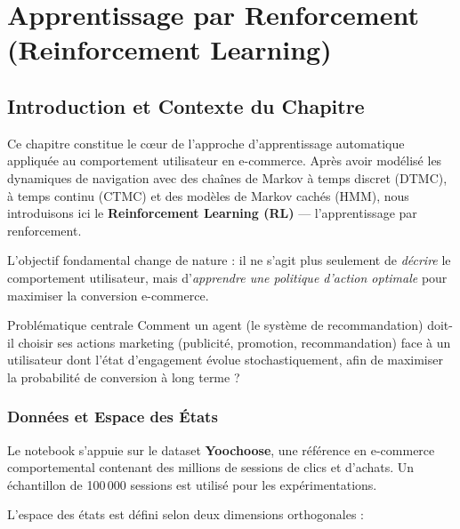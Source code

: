 \documentclass[11pt,a4paper]{article}
\begin{document}
\section{Apprentissage par Renforcement (Reinforcement Learning)}




\subsection{Introduction et Contexte du Chapitre}

Ce chapitre constitue le cœur de l'approche d'apprentissage automatique appliquée au comportement utilisateur en e-commerce. Après avoir modélisé les dynamiques de navigation avec des chaînes de Markov à temps discret (DTMC), à temps continu (CTMC) et des modèles de Markov cachés (HMM), nous introduisons ici le \textbf{Reinforcement Learning (RL)} — l'apprentissage par renforcement.

L'objectif fondamental change de nature : il ne s'agit plus seulement de \emph{décrire} le comportement utilisateur, mais d'\emph{apprendre une politique d'action optimale} pour maximiser la conversion e-commerce.

\begin{exbox}{Problématique centrale}
Comment un agent (le système de recommandation) doit-il choisir ses actions marketing (publicité, promotion, recommandation) face à un utilisateur dont l'état d'engagement évolue stochastiquement, afin de maximiser la probabilité de conversion à long terme ?
\end{exbox}

\subsubsection{Données et Espace des États}

Le notebook s'appuie sur le dataset \textbf{Yoochoose}, une référence en e-commerce comportemental contenant des millions de sessions de clics et d'achats. Un échantillon de 100\,000 sessions est utilisé pour les expérimentations.

L'espace des états est défini selon deux dimensions orthogonales :
\end{document}
